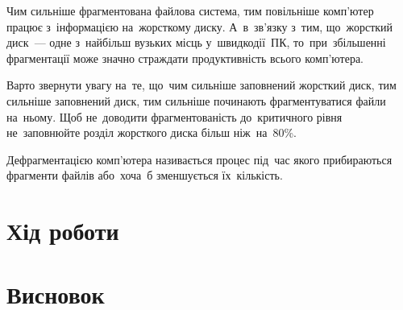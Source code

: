 \documentclass[
	a4paper,
	oneside,
	DIV = 12,
	fontsize = 13pt,
	headings = normal,
]{scrartcl}
\begin{document}
		Чим сильніше фрагментована файлова система, тим повільніше комп'ютер працює з~інформацією на~жорсткому диску. А~в~зв'язку з~тим, що~жорсткий диск~— одне з~найбільш вузьких місць у~швидкодії~ПК, то~при~збільшенні фрагментації може значно страждати продуктивність всього комп'ютера.

		Варто звернути увагу на~те, що~чим сильніше заповнений жорсткий диск, тим сильніше заповнений диск, тим сильніше починають фрагментуватися файли на~ньому. Щоб не~доводити фрагментованість до~критичного рівня не~заповнюйте розділ жорсткого диска більш ніж~на~80\%.

		Дефрагментацією комп'ютера називається процес під~час якого прибираються фрагменти файлів або~хоча~б зменшується їх~кількість.

	\section{Хід роботи}

	\section{Висновок}
\end{document}
